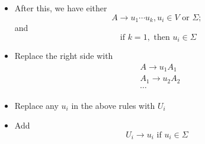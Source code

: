 \begin{frame}[allowframebreaks]
\begin{itemize}
\item After this, we have either
  \begin{equation*}
    A \rightarrow u_1 \cdots u_k, u_i \in V
      \mbox{ or } \Sigma;
\end{equation*}
and 
\begin{equation*}
\mbox{ if }
k = 1, \mbox{ then } u_i \in \Sigma
\end{equation*}
\item Replace the right side with
  \begin{equation*}
    \begin{split}
& A \rightarrow u_1A_1 \\
& A_1 \rightarrow u_2A_2 \\
& \cdots
\end{split}
\end{equation*}
\item Replace any $u_i$ in the above rules with $U_i$
\item Add
  \begin{equation*}
U_i \rightarrow u_i \text{ if } u_i \in \Sigma    
  \end{equation*}
\end{itemize}\end{frame}

